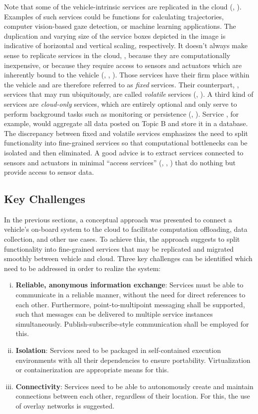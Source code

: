 Note that some of the vehicle-intrinsic services are replicated in the cloud (, ). Examples of such services could be functions for calculating trajectories, computer vision-based gaze detection, or machine learning applications. The duplication and varying size of the service boxes depicted in the image is indicative of horizontal and vertical scaling, respectively. It doesn't always make sense to replicate services in the cloud, \eg , because they are computationally inexpensive, or because they require access to sensors and actuators which are inherently bound to the vehicle (, , ). Those services have their firm place within the vehicle and are therefore referred to as \emph{fixed} services. Their counterpart, \ie , services that may run ubiquitously, are called \emph{volatile} services (, ). A third kind of services are \emph{cloud-only} services, which are entirely optional and only serve to perform background tasks such as monitoring or persistence (, ). Service , for example, would aggregate all data posted on Topic B and store it in a database. The discrepancy between fixed and volatile services emphasizes the need to split functionality into fine-grained services so that computational bottlenecks can be isolated and then eliminated. A good advice is to extract services connected to sensors and actuators in minimal ``access services'' (, , ) that do nothing but provide access to sensor data.
%
%
%
%
%
%
%
%
%
%
\subsection{Key Challenges}
\label{sec:challenges}
In the previous sections, a conceptual approach was presented to connect a vehicle's on-board system to the cloud to facilitate computation offloading, data collection, and other use cases. To achieve this, the approach suggests to split functionality into fine-grained services that may be replicated and migrated smoothly between vehicle and cloud. Three key challenges can be identified which need to be addressed in order to realize the system:

\begin{enumerate}[(i)]
\item \textbf{Reliable, anonymous information exchange}: Services must be able to communicate in a reliable manner, without the need for direct references to each other. Furthermore, point-to-multipoint messaging shall be supported, such that messages can be delivered to multiple service instances simultaneously. Publish-subscribe-style communication shall be employed for this.
\item \textbf{Isolation}: Services need to be packaged in self-contained execution environments with all their dependencies to ensure portability. Virtualization or containerization are appropriate means for this.
\item \textbf{Connectivity}: Services need to be able to autonomously create and maintain connections between each other, regardless of their location. For this, the use of overlay networks is suggested.
\end{enumerate}
%
%
%
%
%
%
%
%
%
%
